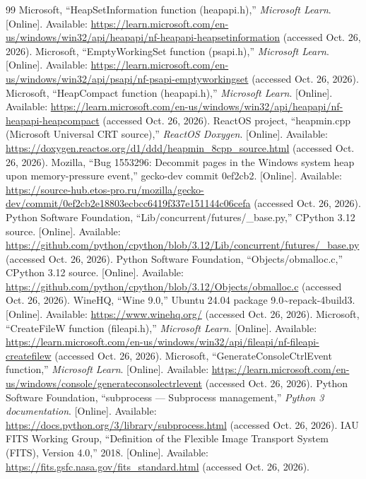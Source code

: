 \documentclass[11pt,a4paper]{article}
\newcommand{\code}[1]{\texttt{\detokenize{#1}}}
\begin{document}
\begin{thebibliography}{99}
 Microsoft, ``HeapSetInformation function (heapapi.h),'' \emph{Microsoft Learn}. [Online]. Available: \url{https://learn.microsoft.com/en-us/windows/win32/api/heapapi/nf-heapapi-heapsetinformation} (accessed Oct. 26, 2026).
 Microsoft, ``EmptyWorkingSet function (psapi.h),'' \emph{Microsoft Learn}. [Online]. Available: \url{https://learn.microsoft.com/en-us/windows/win32/api/psapi/nf-psapi-emptyworkingset} (accessed Oct. 26, 2026).
 Microsoft, ``HeapCompact function (heapapi.h),'' \emph{Microsoft Learn}. [Online]. Available: \url{https://learn.microsoft.com/en-us/windows/win32/api/heapapi/nf-heapapi-heapcompact} (accessed Oct. 26, 2026).
 ReactOS project, ``heapmin.cpp (Microsoft Universal CRT source),'' \emph{ReactOS Doxygen}. [Online]. Available: \url{https://doxygen.reactos.org/d1/ddd/heapmin_8cpp_source.html} (accessed Oct. 26, 2026).
 Mozilla, ``Bug 1553296: Decommit pages in the Windows system heap upon memory-pressure event,'' gecko-dev commit 0ef2cb2. [Online]. Available: \url{https://source-hub.etos-pro.ru/mozilla/gecko-dev/commit/0ef2cb2e18803ecbcc6419f337e151144c06cefa} (accessed Oct. 26, 2026).
 Python Software Foundation, ``Lib/concurrent/futures/\_base.py,'' CPython 3.12 source. [Online]. Available: \url{https://github.com/python/cpython/blob/3.12/Lib/concurrent/futures/_base.py} (accessed Oct. 26, 2026).
 Python Software Foundation, ``Objects/obmalloc.c,'' CPython 3.12 source. [Online]. Available: \url{https://github.com/python/cpython/blob/3.12/Objects/obmalloc.c} (accessed Oct. 26, 2026).
 WineHQ, ``Wine 9.0,'' Ubuntu 24.04 package \code{wine64} 9.0\textasciitilde repack-4build3. [Online]. Available: \url{https://www.winehq.org/} (accessed Oct. 26, 2026).
 Microsoft, ``CreateFileW function (fileapi.h),'' \emph{Microsoft Learn}. [Online]. Available: \url{https://learn.microsoft.com/en-us/windows/win32/api/fileapi/nf-fileapi-createfilew} (accessed Oct. 26, 2026).
 Microsoft, ``GenerateConsoleCtrlEvent function,'' \emph{Microsoft Learn}. [Online]. Available: \url{https://learn.microsoft.com/en-us/windows/console/generateconsolectrlevent} (accessed Oct. 26, 2026).
 Python Software Foundation, ``subprocess --- Subprocess management,'' \emph{Python 3 documentation}. [Online]. Available: \url{https://docs.python.org/3/library/subprocess.html} (accessed Oct. 26, 2026).
 IAU FITS Working Group, ``Definition of the Flexible Image Transport System (FITS), Version 4.0,'' 2018. [Online]. Available: \url{https://fits.gsfc.nasa.gov/fits_standard.html} (accessed Oct. 26, 2026).

\end{thebibliography}
\end{document}
